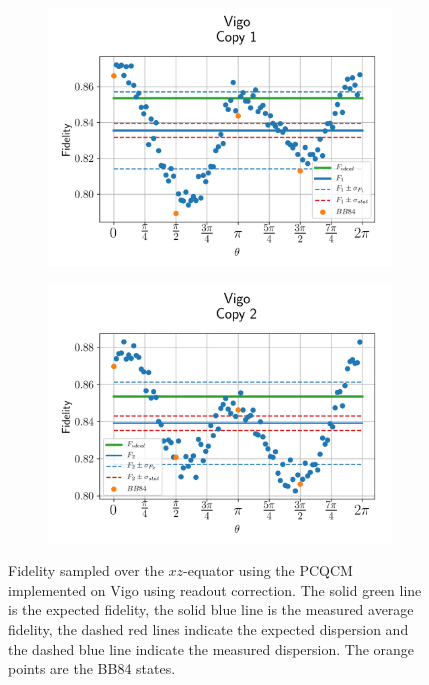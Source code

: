 \begin{figure}[H]
  \centering
  \begin{subfigure}{.5\textwidth}
    \centering
    \includegraphics[width=\textwidth]{Figures/PhaseCovariant/IBM/OnlyEquator/results_corrected_vigo_copy1.png}
    \label{fig:pc_corrected_vigo_equator_1}
  \end{subfigure}%
  \begin{subfigure}{.5\textwidth}
    \centering
    \includegraphics[width=\textwidth]{Figures/PhaseCovariant/IBM/OnlyEquator/results_corrected_vigo_copy2.png}
    \label{fig:pc_corrected_vigo_equator_2}
  \end{subfigure}
  \vspace{-0.5cm}
  \caption{Fidelity sampled over the $xz$-equator using the PCQCM implemented on Vigo using readout correction. The solid green line is the expected fidelity, the solid blue line is the measured average fidelity, the dashed red lines indicate the expected dispersion and the dashed blue line indicate the measured dispersion. The orange points are the BB84 states.}
  \label{fig:pc_corrected_vigo_equator}
\end{figure}


